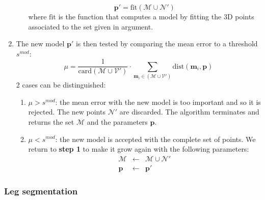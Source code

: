\documentclass[letterpaper, 10 pt, conference]{ieeeconf}
\begin{document}
\begin{enumerate}
\begin{enumerate}
\begin{equation}
			\mathbf{p'} = \mathrm{fit}\left(\mathcal{M}\cup\mathcal{N}'\right)
		\end{equation}
		where $\mathrm{fit}$ is the function that computes a model by fitting the 3D points associated to the set given in argument.
	\end{enumerate}
	\item The new model $\mathbf{p'}$ is then tested by comparing the mean error to a threshold $s^{mod}$:
	\begin{equation}
		\mu = \frac{1}{\mathrm{card}\left(\mathcal{M}\cup\mathcal{V}'\right)}\cdot
		\sum_{\mathbf{m}_{i}\in\left(\mathcal{M}\cup\mathcal{V}'\right)} \mathrm{dist}(\mathbf{m}_i,\mathbf{p})
	\end{equation}
	2 cases can be distinguished:
	\begin{enumerate}
		\item $\mu > s^{mod}$: the mean error with the new model is too important and so it is rejected. The new points $\mathcal{N}'$ are discarded. The algorithm terminates and returns the set $\mathcal{M}$ and the parameters $\mathbf{p}$.
		\item $\mu < s^{mod}$: the new model is accepted with the complete set of points. We return to \textbf{step 1} to make it grow again with the following parameters:
		\begin{eqnarray}
			\mathcal{M}&\leftarrow&\mathcal{M}\cup\mathcal{N}'\\
			\mathbf{p} &\leftarrow& \mathbf{p}'
		\end{eqnarray}
	\end{enumerate}
\end{enumerate}

\subsubsection{Leg segmentation}
\label{subsub:legSegmentation}
\end{document}
